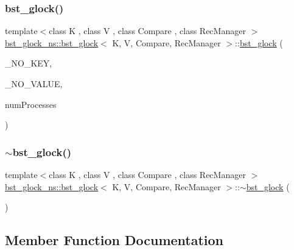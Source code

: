 \subsubsection{\texorpdfstring{bst\+\_\+glock()}{bst\_glock()}}
{\footnotesize\ttfamily template$<$class K , class V , class Compare , class Rec\+Manager $>$ \\
\hyperlink{classbst__glock__ns_1_1bst__glock}{bst\+\_\+glock\+\_\+ns\+::bst\+\_\+glock}$<$ K, V, Compare, Rec\+Manager $>$\+::\hyperlink{classbst__glock__ns_1_1bst__glock}{bst\+\_\+glock} (\begin{DoxyParamCaption}\item[{const K}]{\+\_\+\+N\+O\+\_\+\+K\+EY,  }\item[{const V}]{\+\_\+\+N\+O\+\_\+\+V\+A\+L\+UE,  }\item[{const int}]{num\+Processes }\end{DoxyParamCaption})\hspace{0.3cm}{\ttfamily [inline]}}

\mbox{\label{classbst__glock__ns_1_1bst__glock_ad621272e8f1ad344efbdc9cab241ebf5}} 
\subsubsection{\texorpdfstring{$\sim$bst\+\_\+glock()}{~bst\_glock()}}
{\footnotesize\ttfamily template$<$class K , class V , class Compare , class Rec\+Manager $>$ \\
\hyperlink{classbst__glock__ns_1_1bst__glock}{bst\+\_\+glock\+\_\+ns\+::bst\+\_\+glock}$<$ K, V, Compare, Rec\+Manager $>$\+::$\sim$\hyperlink{classbst__glock__ns_1_1bst__glock}{bst\+\_\+glock} (\begin{DoxyParamCaption}{ }\end{DoxyParamCaption})\hspace{0.3cm}{\ttfamily [inline]}}



\subsection{Member Function Documentation}
\mbox{\label{classbst__glock__ns_1_1bst__glock_a269c46f77c8f6a336291082ed1a238a8}} 
